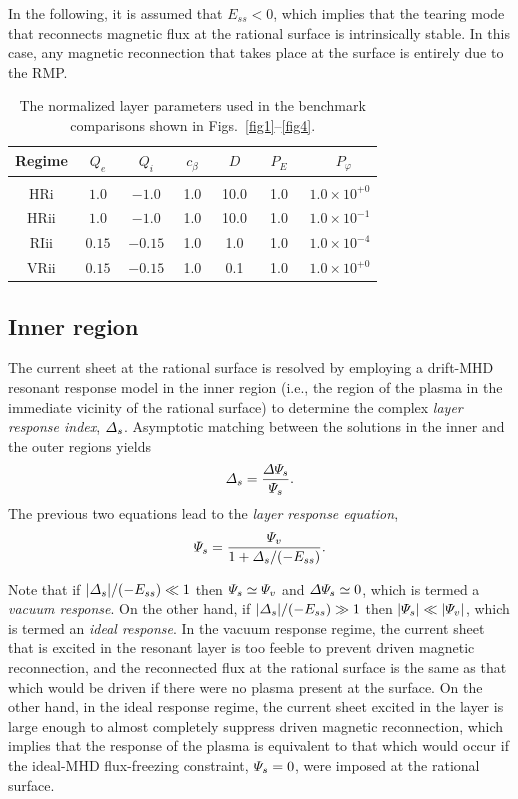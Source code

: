 \documentclass[12pt,prb,aps]{revtex4-1}
\begin{document}
In the following, it is assumed that $E_{ss}<0$, which implies that the tearing mode that
reconnects magnetic flux at the rational surface is intrinsically stable. In this case, any magnetic reconnection that takes place at the
surface is entirely due to the RMP. 

\begin{table}[t]
\centering
\begin{tabular}{ccccccc}
\hline
Regime & ~$Q_e$~ & ~$Q_i$~ & ~$c_\beta$~ & ~$D$~ & ~$P_E$~ & ~$P_\varphi$\\[0.5ex]\hline
&&&&&&\\[-4ex]
HRi  & $1.0$  & $-1.0$  &1.0  &10.0 & 1.0 & $1.0\times 10^{+0}$\\[0.5ex]
HRii & $1.0$  & $-1.0$  & 1.0 & 10.0& 1.0 & $1.0\times 10^{-1}$\\[0.5ex]
RIii   & $0.15$ & $-0.15$ &1.0 & 1.0 & 1.0 & $1.0\times 10^{-4}$\\[0.5ex]
VRii & $0.15$ & $-0.15$ &1.0 & 0.1& 1.0 & $1.0\times 10^{+0}$
\end{tabular}
\caption{The normalized layer parameters used in the benchmark comparisons shown in Figs.~\ref{fig1}--\ref{fig4}. }\label{t1}
\end{table}

\subsection{Inner region}
The current sheet at the rational surface is resolved by employing a drift-MHD resonant response model
in the  inner region (i.e., the region of the plasma in the immediate vicinity of the rational surface) to determine the
complex {\em layer response index}, ${\mit\Delta}_s$. Asymptotic matching between the solutions in the inner and the outer regions
yields
\begin{equation}\label{e4g}
{\mit\Delta}_s= \frac{{\mit\Delta\Psi}_{\!s}}{{\mit\Psi}_s}.
\end{equation}
The previous two equations lead to the {\em layer response equation}, 
\begin{equation}\label{response}
{\mit\Psi}_s = \frac{{\mit\Psi}_v}{1+{\mit\Delta}_s/(-E_{ss})}.
\end{equation}

Note that if $|{\mit\Delta}_s|/(-E_{ss})\ll 1$ then ${\mit\Psi}_s\simeq {\mit\Psi}_v$ and ${\mit\Delta\Psi}_{\!s}\simeq 0$, 
which is termed a {\em vacuum response}. On the other hand, if $|{\mit\Delta}_s|/(-E_{ss})\gg 1$ then $|{\mit\Psi}_s|\ll |{\mit\Psi}_v|$,
which is termed an {\em ideal response}. In the vacuum response regime, the current sheet that is excited in the resonant layer is too feeble
to prevent driven magnetic reconnection, and the reconnected flux at the rational surface is the same as that which would
be driven if there were no plasma present at the surface. On the other hand, in the ideal response regime, the  current sheet excited in the layer is
large enough to almost completely suppress driven magnetic reconnection, which implies that the response of the plasma is equivalent
to that which would occur if the ideal-MHD flux-freezing constraint, ${\mit\Psi}_s=0$, were imposed at the rational surface.\cite{rf2025}
\end{document}
